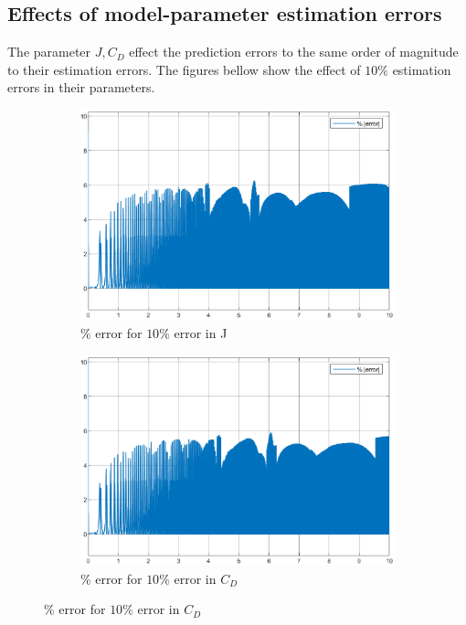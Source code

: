 \subsection{Effects of model-parameter estimation errors}
The parameter $J, C_D$ effect the prediction errors to the same order of
magnitude to their estimation errors. The figures bellow show the effect of
$10\%$ estimation errors in their parameters.

\begin{figure}[H]
\begin{minipage}{0.49\textwidth}
    \begin{figure}[H]
        \includegraphics[width = \textwidth]{figs/par_var/j.eps}
        \caption{$\%$ error for $10\%$ error in J}
    \end{figure}
\end{minipage}
\begin{minipage}{0.49\textwidth}
    \begin{figure}[H]
        \includegraphics[width = \textwidth]{figs/par_var/c_d.eps}
        \caption{$\%$ error for $10\%$ error in $C_D$}
    \end{figure}
\end{minipage}
\end{figure}

